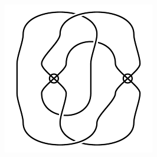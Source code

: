 \begin{figure}[H]
\begin{minipage}[b]{.18\linewidth}
\end{minipage}
\begin{minipage}[b]{.18\linewidth}
\centering
\includegraphics[width=\linewidth]{../data/virtual_4_51.png}
\end{minipage}
\end{figure}

